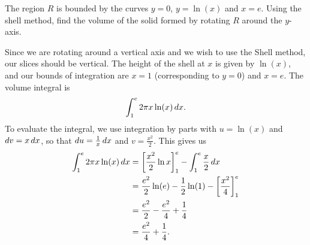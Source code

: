 \documentclass[]{ximera}
\begin{document}
\begin{problem}
The region $R$ is bounded by the curves $y=0$, $y=\ln (x)$ and $x=e$. Using the shell method, find the volume of the solid formed by rotating $R$ around the $y$-axis.
\end{problem}

\begin{freeResponse}
Since we are rotating around a vertical axis and we wish to use the Shell method, our slices should be vertical. The height of the shell at $x$ is given by $\ln (x)$, and our bounds of integration are $x=1$ (corresponding to $y=0$) and $x=e$. The volume integral is 
$$
\int_1^e 2 \pi x \ln (x) \mathop{}\!d x.
$$ 
To evaluate the integral, we use integration by parts with $u = \ln (x)$ and $\mathop{}\!d v = x \mathop{}\!d x$, so that $\mathop{}\!d u = \frac{1}{x} \mathop{}\!d x$ and $v = \frac{x^2}{2}$. This gives us 
\begin{align*}
\int_1^e 2 \pi x \ln (x) \mathop{}\!d x &= \bigg[ \frac{x^2}{2} \ln x \bigg]_1^e - \int_1^e \frac{x}{2} \mathop{}\!d x \\
&= \frac{e^2}{2}\ln(e) - \frac{1}{2}\ln (1) - \bigg[ \frac{x^2}{4} \bigg]_1^e \\
&= \frac{e^2}{2} - \frac{e^2}{4} + \frac{1}{4} \\
&= \frac{e^2}{4} + \frac{1}{4}.
\end{align*}
\end{freeResponse}
\end{document}
